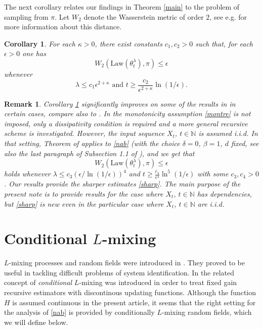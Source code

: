 \documentclass[a4paper,draft]{article}
\newtheorem{corollary}[theorem]{Corollary}
\newtheorem{remark}[theorem]{Remark}
\begin{document}
The next corollary relates our findings in Theorem \ref{main}
to the problem of sampling from $\pi$. Let $W_2$
denote the Wasserstein metric of order $2$, see e.g. \cite{villani}
for more information about this distance.

\begin{corollary}\label{dros} For each $\kappa>0$, there exist constants $c_1,c_2>0$ such that, for each
$\epsilon>0$ one has
$$
W_2(\mathrm{Law}(\theta^{\lambda}_t),\pi)\leq \epsilon
$$
whenever
\begin{equation}\label{sharp}
\lambda\leq  c_1\epsilon^{2+\kappa}\mbox{ and }t\geq
\frac{c_2}{\epsilon^{2+\kappa}}\ln(1/\epsilon).
\end{equation}
\end{corollary}

\begin{remark}{\rm Corollary \ref{dros} significantly improves on
some of the results in \cite{raginsky} in certain cases, compare
also to \cite{xu}.
In \cite{raginsky} the monotonicity assumption \eqref{montre} is not
imposed, only a dissipativity condition is required and a more
general recursive scheme is investigated. However, the input
sequence $X_t$, $t\in\mathbb{N}$ is assumed i.i.d.
In that setting, Theorem of
\cite{raginsky} applies to \eqref{nab} (with the choice $\delta=0$,
$\beta=1$, $d$ fixed, see also the last paragraph of Subsection 1.1
of \cite{raginsky}), and we get that
$$
W_2(\mathrm{Law}(\theta^{\lambda}_t),\pi)\leq \epsilon
$$
holds whenever
$\lambda\leq c_3(\epsilon/\ln(1/\epsilon))^4$ and
$t\geq \frac{c_4}{\epsilon^4}\ln^5(1/\epsilon)$ with some $c_3,c_4>0$.
Our results provide the sharper estimates \eqref{sharp}. The main
purpose of the present note is to provide results for the case where
$X_t$, $t\in\mathbb{N}$ has dependencies, but \eqref{sharp} is
new even in the particular case where $X_t$, $t\in\mathbb{N}$ are i.i.d.}
\end{remark}

\section{Conditional $L$-mixing}\label{lm}

$L$-mixing processes and random fields
were introduced in \cite{laci1}. They proved to be useful in
tackling difficult problems of system identification. In
\cite{4} the related concept of \emph{conditional} $L$-mixing
was introduced in order to treat fixed gain recursive estimators
with discontinous updating functions. Although the function $H$
is assumed continuous in the present article, it seems that
the right setting for the analysis of \eqref{nab} is provided
by conditionally $L$-mixing random fields, which we will define below.
\end{document}
